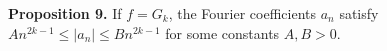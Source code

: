 \textbf{Proposition 9.} If $f = G_k$, the Fourier coefficients $a_n$ satisfy $An^{2k-1} \leq |a_n| \leq B n^{2k-1}$ for some constants $A, B > 0$.
